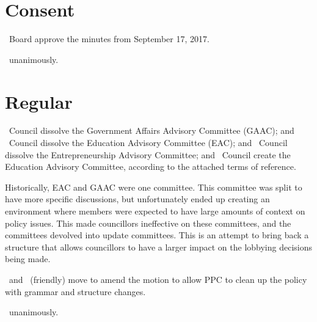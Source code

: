 \section*{Consent}

\begin{motion}
    \birt\ Board approve the minutes from September 17, 2017.
    \movers{\seneca}{\tristan}

    \carries\ unanimously.
\end{motion}

\section*{Regular}
\begin{motion}
    \birt\ Council dissolve the Government Affairs Advisory Committee (GAAC); and
    \bifrt\ Council dissolve the Education Advisory Committee (EAC); and
    \bifrt\ Council dissolve the Entrepreneurship Advisory Committee; and
    \bifrt\ Council create the Education Advisory Committee, according to the
    attached terms of reference. 
    \movers{\andrewc}{\jason}

    Historically, EAC and GAAC were one committee. This committee was split to
    have more specific discussions, but unfortunately ended up creating an 
    environment where members were expected to have large amounts of context on 
    policy issues. This made councillors ineffective on these committees, and 
    the committees devolved into update committees. This is an attempt to 
    bring back a structure that allows councillors to have a larger impact
    on the lobbying decisions being made.

    \seneca\ and \jason\ (friendly) move to amend the motion to allow PPC to 
    clean up the policy with grammar and structure changes. 

    \carries\ unanimously.
\end{motion}


